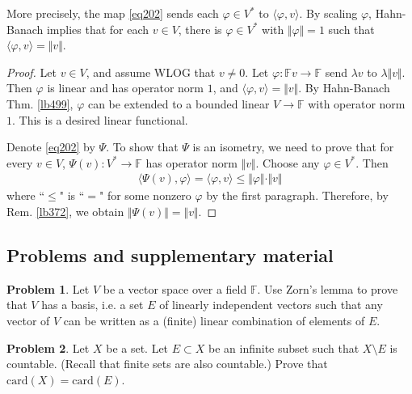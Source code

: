 \documentclass[12pt,b5paper,notitlepage]{article}
\theoremstyle{definition}
\newtheorem{prob}{\color{red}Problem}[section]
\theoremstyle{plain}
\newcommand{\bk}[1]{\langle {#1}\rangle}
\newcommand{\Fbb}{\mathbb F}
\newcommand{\card}{\mathrm{card}}
\numberwithin{equation}{section}
\begin{document}
More precisely, the map \eqref{eq202} sends each $\varphi\in V^*$ to $\bk{\varphi,v}$. By scaling $\varphi$, Hahn-Banach implies that for each $v\in V$, there is $\varphi\in V^*$ with $\Vert\varphi\Vert=1$ such that $\bk{\varphi,v}=\Vert v\Vert$.

\begin{proof}
Let $v\in V$, and assume WLOG that $v\neq 0$. Let $\varphi:\Fbb v\rightarrow \Fbb$ send $\lambda v$ to $\lambda\Vert v\Vert$. Then $\varphi$ is linear and has operator norm $1$, and $\bk{\varphi,v}=\Vert v\Vert$. By Hahn-Banach Thm. \ref{lb499}, $\varphi$ can be extended to a bounded linear $V\rightarrow\Fbb$ with operator norm $1$. This is a desired linear functional.

Denote \eqref{eq202} by $\Psi$. To show that $\Psi$ is an isometry, we need to prove that for every $v\in V$, $\Psi(v):V^*\rightarrow\Fbb$ has operator norm $\Vert v\Vert$. Choose any $\varphi\in V^*$. Then 
\begin{align*}
\bk{\Psi(v),\varphi}=\bk{\varphi,v}\leq\Vert\varphi\Vert\cdot\Vert v\Vert
\end{align*}
where ``$\leq$" is ``$=$" for some nonzero $\varphi$ by the first paragraph. Therefore, by Rem. \ref{lb372}, we obtain $\Vert\Psi(v)\Vert=\Vert v\Vert$.
\end{proof}















\subsection{Problems and supplementary material}


\begin{prob}
Let $V$ be a vector space over a field $\Fbb$. Use Zorn's lemma to prove that $V$ has a basis, i.e. a set $E$ of linearly independent vectors such that any vector of $V$ can be written as a (finite) linear combination of elements of $E$.
\end{prob}



\begin{prob}
Let $X$ be a set. Let $E\subset X$ be an infinite subset such that $X\setminus E$ is countable. (Recall that finite sets are also countable.) Prove that $\card(X)=\card(E)$.
\end{prob}
\end{document}

